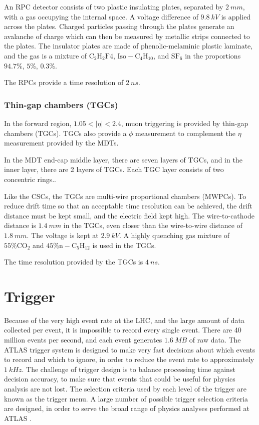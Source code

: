 An RPC detector consists of two plastic insulating plates, separated by $2~mm$, with a gas occupying the internal space.
A voltage difference of $9.8~kV$ is applied across the plates.
Charged particles passing through the plates generate an avalanche of charge which can then be measured by metallic strips connected to the plates.
The insulator plates are made of phenolic-melaminic plastic laminate,
and the gas is a mixture of $\mathrm{C_2 H_2 F4}$, $\mathrm{Iso-C_4 H_{10}}$, and $\mathrm{SF_6}$
in the proportions $94.7\%$, $5\%$, $0.3\%$.\cite{atlas-detector-2008}

The RPCs provide a time resolution of $2~ns$.

\subsubsection{Thin-gap chambers (TGCs)}

In the forward region, $1.05 < |\eta| < 2.4$, muon triggering is provided by thin-gap chambers (TGCs).
TGCs also provide a $\phi$ measurement to complement the $\eta$ measurement provided by the MDTs.

In the MDT end-cap middle layer, there are seven layers of TGCs, and in the inner layer, there are 2 layers of TGCs.
Each TGC layer consists of two concentric rings..

Like the CSCs, the TGCs are multi-wire proportional chambers (MWPCs).
To reduce drift time so that an acceptable time resolution can be achieved, the drift distance must be kept small,
and the electric field kept high.
The wire-to-cathode distance is $1.4~mm$ in the TGCs, even closer than the wire-to-wire distance of $1.8~mm$.
The voltage is kept at $2.9~kV$.
A highly quenching gas mixture of $55\% \mathrm{CO_2}$ and $45\% \mathrm{n-C_5 H_{12}}$ is used in the TGCs.\cite{atlas-detector-2008}

The time resolution provided by the TGCs is $4~ns$.\cite{muon-2003}

\section{Trigger}\label{sec:trigger}

Because of the very high event rate at the LHC, and the large amount of data collected per event,
it is impossible to record every single event.
There are 40 million events per second, and each event generates $1.6~MB$ of raw data.
The ATLAS trigger system is designed to make very fast decisions about which events to record and which to ignore,
in order to reduce the event rate to approximately $1~kHz$.
The challenge of trigger design is to balance processing time against decision accuracy,
to make sure that events that could be useful for physics analysis are not lost.
The selection criteria used by each level of the trigger are known as the trigger menu.
A large number of possible trigger selection criteria are designed, in order to serve the broad range of physics analyses performed at ATLAS .

